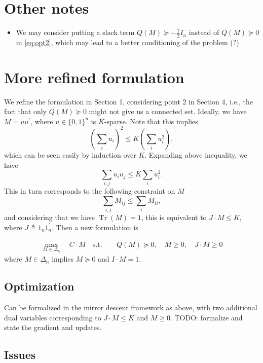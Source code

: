 \documentclass{article}
\DeclareMathOperator{\Tr}{Tr}
\begin{document}
\section{Other notes}

\begin{itemize}
\item We may consider putting a slack term $Q(M) \succeq -\frac{\gamma}{2} I_n$ instead of $Q(M) \succeq 0$ in \eqref{eq:opt2}, which may lead to a better conditioning of the problem (?)
\end{itemize}



\section{More refined formulation}

We refine the formulation in Section 1, considering point 2 in Section 4, i.e., the fact that only $Q(M) \succeq 0$ might not give us a connected set. Ideally, we have $M = u u^\prime$, where $u \in \{0,1\}^n$ is $K$-sparse. Note that this implies
\[ \left( \sum_i u_i \right)^2 \leq K \left( \sum_i u_i^2 \right), \]
which can be seen easily by induction over $K$. Expanding above inequality, we have
\[ \sum_{i,j} u_i u_j \leq K \sum_i u_i^2. \]
This in turn corresponds to the following constraint on $M$
\[ \sum_{i,j} M_{ij} \leq \sum_i M_{ii}, \]
and considering that we have $\Tr(M) = 1$, this is equivalent to $J \cdot M \leq K$, where $J \triangleq 1_n 1_n^\prime$. Then a new formulation is

\begin{align*}
  \max_{M \in \Delta_n} \quad C \cdot M \quad \mathrm{s.t.\ } \quad & Q(M) \succeq 0, \quad M \geq 0, \quad J \cdot M \geq 0
\end{align*}
where $M \in \Delta_n$ implies $M \succeq 0$ and $I \cdot M = 1$.

\subsection{Optimization}

Can be formalized in the mirror descent framework as above, with two additional dual variables corresponding to $J \cdot M \leq K$ and $M \geq 0$. TODO: formalize and state the gradient and updates.

\subsection{Issues}
\end{document}
